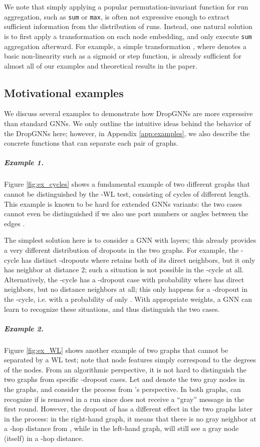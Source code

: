 \documentclass{article}
\begin{document}
We note that simply applying a popular permutation-invariant function for run aggregation, such as \texttt{sum} or \texttt{max}, is often not expressive enough to extract sufficient information from the distribution of runs. Instead, one natural solution is to first apply a transformation on each node embedding, and only execute \texttt{sum} aggregation afterward. For example, a simple transformation , where  denotes a basic non-linearity such as a sigmoid or step function, is already sufficient for almost all of our examples and theoretical results in the paper.

\subsection{Motivational examples} \label{sec:examples}

We discuss several examples to demonstrate how DropGNNs are more expressive than standard GNNs. We only outline the intuitive ideas behind the behavior of the DropGNNs here; however, in Appendix \ref{app:examples}, we also describe the concrete functions that can separate each pair of graphs.

\subparagraph*{Example 1.} Figure \ref{fig:ex_cycles} shows a fundamental example of two different graphs that cannot be distinguished by the -WL test, consisting of cycles of different length. This example is known to be hard for extended GNNs variants: the two cases cannot even be distinguished if we also use port numbers or angles between the edges \citep{limits}.

The simplest solution here is to consider a GNN with  layers; this already provides a very different distribution of dropouts in the two graphs. For example, the -cycle has  distinct -dropouts where  retains both of its direct neighbors, but it only has  neighbor at distance 2; such a situation is not possible in the -cycle at all. Alternatively, the -cycle has a -dropout case with probability  where  has  direct neighbors, but no distance  neighbors at all; this only happens for a -dropout in the -cycle, i.e. with a probability of only . With appropriate weights, a GNN can learn to recognize these situations, and thus distinguish the two cases.

\subparagraph*{Example 2.} Figure \ref{fig:ex_WL} shows another example of two graphs that cannot be separated by a WL test; note that node features simply correspond to the degrees of the nodes. From an algorithmic perspective, it is not hard to distinguish the two graphs from specific -dropout cases. Let  and  denote the two gray nodes in the graphs, and consider the process from 's perspective. In both graphs,  can recognize if  is removed in a run since  does not receive a ``gray'' message in the first round. However, the dropout of  has a different effect in the two graphs later in the process: in the right-hand graph, it means that there is no gray neighbor at a -hop distance from , while in the left-hand graph,  will still see a gray node (itself) in a -hop distance.
\end{document}
